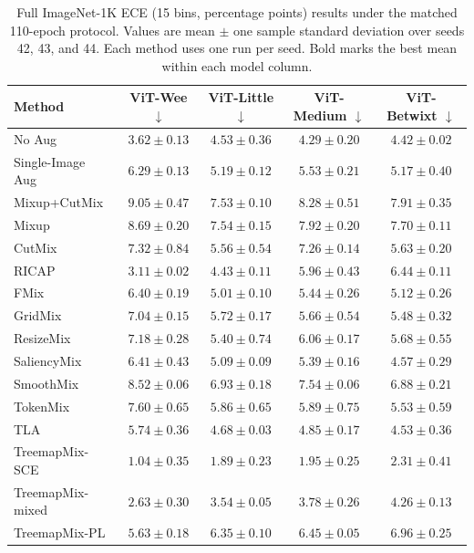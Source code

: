 \begin{table}[!htbp]
  \caption{Full ImageNet-1K ECE (15 bins, percentage points) results under the matched 110-epoch protocol. Values are mean $\pm$ one sample standard deviation over seeds 42, 43, and 44. Each method uses one run per seed. Bold marks the best mean within each model column.}
  \label{tab:in1k-full-results-ece}
  \centering
  \footnotesize
  \setlength{\tabcolsep}{4pt}
  \begin{tabular}{@{}lcccc@{}}
    \toprule
    Method & ViT-Wee $\downarrow$ & ViT-Little $\downarrow$ & ViT-Medium $\downarrow$ & ViT-Betwixt $\downarrow$ \\
    \midrule
    No Aug & $3.62 \pm 0.13$ & $4.53 \pm 0.36$ & $4.29 \pm 0.20$ & $4.42 \pm 0.02$ \\
    Single-Image Aug & $6.29 \pm 0.13$ & $5.19 \pm 0.12$ & $5.53 \pm 0.21$ & $5.17 \pm 0.40$ \\
    Mixup+CutMix & $9.05 \pm 0.47$ & $7.53 \pm 0.10$ & $8.28 \pm 0.51$ & $7.91 \pm 0.35$ \\
    Mixup & $8.69 \pm 0.20$ & $7.54 \pm 0.15$ & $7.92 \pm 0.20$ & $7.70 \pm 0.11$ \\
    CutMix & $7.32 \pm 0.84$ & $5.56 \pm 0.54$ & $7.26 \pm 0.14$ & $5.63 \pm 0.20$ \\
    RICAP & $3.11 \pm 0.02$ & $4.43 \pm 0.11$ & $5.96 \pm 0.43$ & $6.44 \pm 0.11$ \\
    FMix & $6.40 \pm 0.19$ & $5.01 \pm 0.10$ & $5.44 \pm 0.26$ & $5.12 \pm 0.26$ \\
    GridMix & $7.04 \pm 0.15$ & $5.72 \pm 0.17$ & $5.66 \pm 0.54$ & $5.48 \pm 0.32$ \\
    ResizeMix & $7.18 \pm 0.28$ & $5.40 \pm 0.74$ & $6.06 \pm 0.17$ & $5.68 \pm 0.55$ \\
    SaliencyMix & $6.41 \pm 0.43$ & $5.09 \pm 0.09$ & $5.39 \pm 0.16$ & $4.57 \pm 0.29$ \\
    SmoothMix & $8.52 \pm 0.06$ & $6.93 \pm 0.18$ & $7.54 \pm 0.06$ & $6.88 \pm 0.21$ \\
    TokenMix & $7.60 \pm 0.65$ & $5.86 \pm 0.65$ & $5.89 \pm 0.75$ & $5.53 \pm 0.59$ \\
    TLA & $5.74 \pm 0.36$ & $4.68 \pm 0.03$ & $4.85 \pm 0.17$ & $4.53 \pm 0.36$ \\
    TreemapMix-SCE & $\mathbf{1.04 \pm 0.35}$ & $\mathbf{1.89 \pm 0.23}$ & $\mathbf{1.95 \pm 0.25}$ & $\mathbf{2.31 \pm 0.41}$ \\
    TreemapMix-mixed & $2.63 \pm 0.30$ & $3.54 \pm 0.05$ & $3.78 \pm 0.26$ & $4.26 \pm 0.13$ \\
    TreemapMix-PL & $5.63 \pm 0.18$ & $6.35 \pm 0.10$ & $6.45 \pm 0.05$ & $6.96 \pm 0.25$ \\
    \bottomrule
  \end{tabular}
\end{table}
